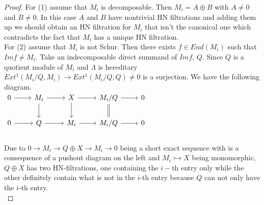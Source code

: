\begin{proof}
\indent For (1) assume that $M_i$ is decomposable. Then $M_i = A\oplus B$ with $A\neq 0$ and $B\neq 0$. In this case $A$ and $B$ have nontrivial HN filtrations and adding them up we should obtain an HN filtration for $M_i$ that isn't the canonical one which contradicts the fact that $M_i$ has a unique HN filtration.\\
\indent For (2) assume that $M_i$ is not Schur. Then there exists $f\in End(M_i)$ such that $Im f\neq M_i$. Take an indecomposable direct summand of $Im f$, $Q$. Since $Q$ is a quotient module of $M_i$ and $\Lambda$ is hereditary $Ext^1(M_i/Q, M_i)\to Ext^1(M_i/Q, Q) \neq 0$ is a surjection. We have the following diagram.\\
$\begin{tikzcd}
0\arrow[r] & M_i\arrow[r]\arrow[d] & X\arrow[r]\arrow[d] & M_i/Q \arrow[r]\arrow[d,equal] & 0\\
0\arrow[r] & Q \arrow[r] & M_i\arrow[r] & M_i/Q \arrow[r] & 0\\
\end{tikzcd}$\\
\indent Due to $0\to M_i\to Q\oplus X\to M_i\to 0$ being a short exact sequence with is a consequence of a pushout diagram on the left and $M_i\rightarrowtail X$ being monomorphic, $Q\oplus X$ has two HN-filtrations, one containing the $i-$th entry only while the other definitely contain what is not in the $i$-th entry because $Q$ can not only have the $i$-th entry.\\
\end{proof}
